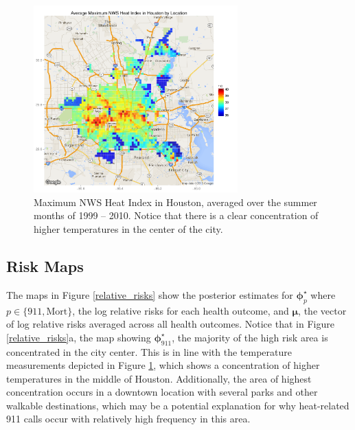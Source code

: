 \documentclass[final]{statsoc}
\begin{document}
\begin{figure}
  \centering
  \includegraphics[width=0.7\textwidth]{imgs/avg_temp.pdf}
  \caption{Maximum NWS Heat Index in Houston, averaged over the summer months of 1999 -- 2010. Notice that there is a clear concentration of higher temperatures in the center of the city.}
  \label{fig:temp}
\end{figure}

\subsection{Risk Maps}
The maps in Figure \ref{relative_risks} show the posterior estimates for $\boldsymbol\phi^\star_{p}$ where $p\in \{911,\text{Mort}\}$, the log relative risks for each health outcome, and $\boldsymbol\mu$, the vector of log relative risks averaged across all health outcomes. Notice that in Figure \ref{relative_risks}a, the map showing $\boldsymbol\phi^\star_{911}$, the majority of the high risk area is concentrated in the city center. This is in line with the temperature measurements depicted in Figure \ref{fig:temp}, which shows a concentration of higher temperatures in the middle of Houston. Additionally, the area of highest concentration occurs in a downtown location with several parks and other walkable destinations, which may be a potential explanation for why heat-related 911 calls occur with relatively high frequency in this area. 
\end{document}
